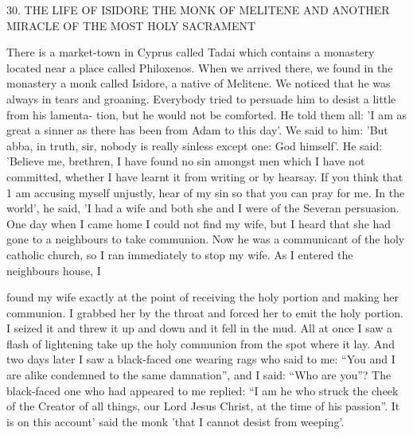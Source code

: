 30.
THE LIFE OF ISIDORE THE MONK OF MELITENE
AND ANOTHER MIRACLE OF THE MOST HOLY SACRAMENT

There is a market-town in Cyprus called Tadai which contains a
monastery located near a place called Philoxenos.
When we arrived
there, we found in the monastery a monk called Isidore, a native of
Melitene.
We noticed that he was always in tears and groaning.
Everybody tried to persuade him to desist a little from his lamenta-
tion, but he would not be comforted.
He told them all: 'I am as
great a sinner as there has been from Adam to this day'.
We said to
him: 'But abba, in truth, sir, nobody is really sinless except one:
God himself'.
He said: 'Believe me, brethren, I have found no sin
amongst men which I have not committed, whether I have learnt it
from writing or by hearsay.
If you think that 1 am accusing myself
unjustly, hear of my sin so that you can pray for me.
In the world',
he said, 'I had a wife and both she and I were of the Severan
persuasion.
One day when I came home I could not find my wife,
but I heard that she had gone to a neighbour\textquotesingle s to take communion.
Now he was a communicant of the holy catholic church, so I ran
immediately to stop my wife.
As I entered the neighbour\textquotesingle s house, I

found my wife exactly at the point of receiving the holy portion and
making her communion.
I grabbed her by the throat and forced her
to emit the holy portion.
I seized it and threw it up and down and
it fell in the mud.
All at once I saw a flash of lightening take up the
holy communion from the spot where it lay.
And two days later I
saw a black-faced one wearing rags who said to me: “You and I are
alike condemned to the same damnation”, and I said: “Who are
you”? The black-faced one who had appeared to me replied: “I am
he who struck the cheek of the Creator of all things, our Lord Jesus
Christ, at the time of his passion”.
It is on this account' said the
monk 'that I cannot desist from weeping'.

